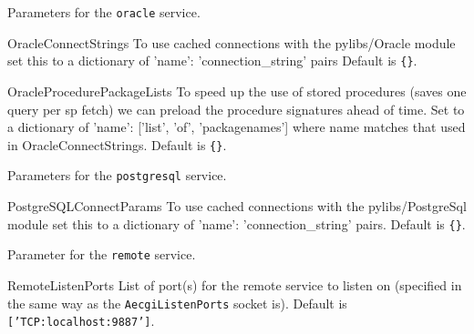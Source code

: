 \documentclass[titlepage]{manual}
\begin{document}
Parameters for the \texttt{oracle} service.
\begin{argdesc}
\item[OracleConnectStrings]  \nonscope
To use cached connections with the pylibs/Oracle module set this to
a dictionary of 'name': 'connection\_string' pairs
Default is \texttt{\{\}}.
\item[OracleProcedurePackageLists] \nonscope
To speed up the use of stored procedures (saves one query per sp fetch)
we can preload the procedure signatures ahead of time.
Set to a dictionary of 'name': ['list', 'of', 'packagenames'] where name
matches that used in OracleConnectStrings.
Default is \texttt{\{\}}.
\end{argdesc}

Parameters for the \texttt{postgresql} service.
\begin{argdesc}
\item[PostgreSQLConnectParams] \nonscope
To use cached connections with the pylibs/PostgreSql module set this to
a dictionary of 'name': 'connection\_string' pairs.
Default is \texttt{\{\}}.
\end{argdesc}



Parameter for the \texttt{remote} service.
\begin{argdesc}
\item[RemoteListenPorts] \nonscope
List of port(s) for the remote service to listen on (specified in the same
way as the \texttt{AecgiListenPorts} socket is).  
Default is \texttt{['TCP:localhost:9887']}.
\end{argdesc}
\end{document}
